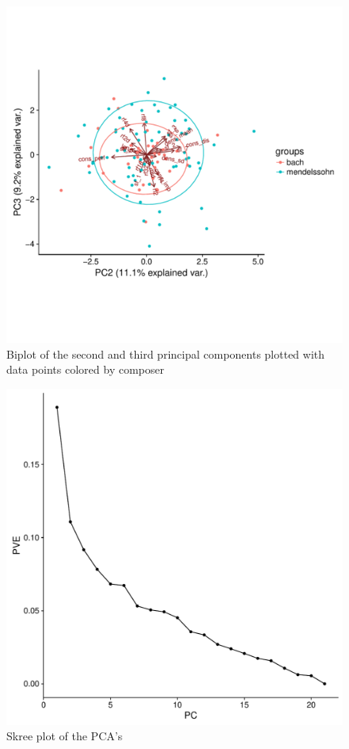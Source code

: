 \documentclass[12pt,twoside]{reedthesis}
\theoremstyle{definition}
\theoremstyle{definition}
\theoremstyle{definition}
\theoremstyle{remark}
\begin{document}
\begin{figure}[H]
\centering
\includegraphics[scale = .5]{images/bi_elipse23.pdf}
\caption{Biplot of the second and third principal components plotted with data points colored by composer}
\label{subd}
\end{figure}
\begin{figure}[H]
\centering
\includegraphics[scale = .5]{images/skree_b.pdf}
\caption{Skree plot of the PCA's}
\label{subd}
\end{figure}
\end{document}
